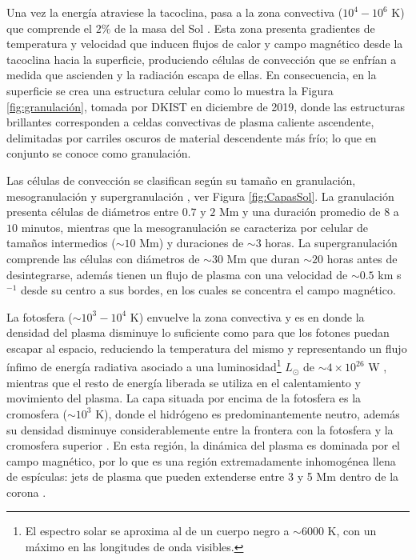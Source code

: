 Una vez la energía atraviese la tacoclina, pasa a la zona convectiva ($10^{4}-10^{6}$ K) que comprende el $2\%$ de la masa del Sol \parencite[e.g][]{hughes-2007}. Esta zona presenta gradientes de temperatura y velocidad que inducen flujos de calor y campo magnético desde la tacoclina hacia la superficie, produciendo células de convección \parencite[e.g.,][]{stein-2012} que se enfrían a medida que ascienden y la radiación escapa de ellas. En consecuencia, en la superficie se crea una estructura celular como lo muestra la Figura \ref{fig:granulación}, tomada por \ac{DKIST} en diciembre de 2019, donde las estructuras brillantes corresponden a celdas convectivas de plasma caliente ascendente, delimitadas por carriles oscuros de material descendente más frío; lo que en conjunto se conoce como granulación. 

Las células de convección se clasifican según su tamaño en granulación, mesogranulación y supergranulación \parencite[e.g.,][]{leighton-1963, rieutord-2010}, ver Figura \ref{fig:CapasSol}. La granulación presenta células de diámetros entre $0.7$ y $2$ Mm y una duración promedio de $8$ a $10$ minutos, mientras que la mesogranulación se caracteriza por celular de tamaños intermedios ($\sim10$ Mm) y duraciones de $\sim 3$ horas. La supergranulación comprende las células con diámetros de $\sim30$ Mm que duran $\sim20$ horas antes de desintegrarse, además tienen un flujo de plasma con una velocidad de $\sim0.5$ km s$^{-1}$ desde su centro a sus bordes, en los cuales se concentra el campo magnético.

La fotosfera ($\sim10^{3}-10^{4}$ K) envuelve la zona convectiva y es en donde la densidad del plasma disminuye lo suficiente como para que los fotones puedan escapar al espacio, reduciendo la temperatura del mismo \parencite[e.g.,][]{wilson-1969,solanki-2001} y representando un flujo ínfimo de energía radiativa asociado a una luminosidad\footnote{El espectro solar se aproxima al de un cuerpo negro a $\sim 6000$ K, con un máximo en las longitudes de onda visibles.} $L_\odot$ de $\sim4\times10^{26}$ W \parencite[e.g.,][]{judge-2020}, mientras que el resto de energía liberada se utiliza en el calentamiento y movimiento del plasma. La capa situada por encima de la fotosfera es la cromosfera ($\sim10^{3}$ K), donde el hidrógeno es predominantemente neutro, además su densidad disminuye considerablemente entre la frontera con la fotosfera y la cromosfera superior \parencite[e.g.,][]{carlsson-2019}. En esta región, la dinámica del plasma es dominada por el campo magnético, por lo que es una región extremadamente inhomogénea llena de espículas: jets de plasma que pueden extenderse entre 3 y 5 Mm dentro de la corona \parencite[e.g.,][]{carlsson-2019}.

